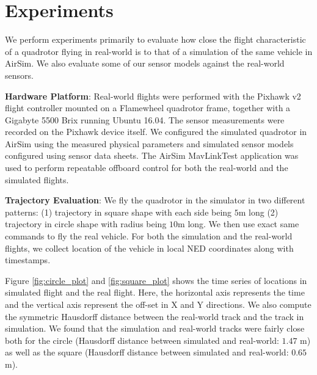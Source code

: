\documentclass[graybox]{svmult}
\begin{document}


\section{Experiments}
We perform experiments primarily to evaluate how close the flight characteristic of a quadrotor flying in real-world is to that of a simulation of the same vehicle in AirSim. We also evaluate some of our sensor models against the real-world sensors.

\vspace{0.075in}
\noindent \textbf{Hardware Platform}: Real-world flights were performed with the Pixhawk v2 flight controller mounted on a Flamewheel quadrotor frame, together with a Gigabyte 5500 Brix running Ubuntu 16.04. The sensor measurements were recorded on the Pixhawk device itself. We configured the simulated quadrotor in AirSim using the measured physical parameters and simulated sensor models configured using sensor data sheets. The AirSim MavLinkTest application was used to perform repeatable offboard control for both the real-world and the simulated flights.

\vspace{0.075in}
\noindent \textbf{Trajectory Evaluation}: We fly the quadrotor in the simulator in two different patterns: (1) trajectory in square shape with each side being $5$m long (2) trajectory in circle shape with radius being $10$m long. We then use exact same commands to fly the real vehicle. For both the simulation and the real-world flights, we collect location of the vehicle in local NED coordinates along with timestamps.

Figure \ref{fig:circle_plot} and \ref{fig:square_plot} shows the time series of locations in simulated flight and the real flight. Here, the horizontal axis represents the time and the vertical axis represent the off-set in X and Y directions. We also compute the symmetric Hausdorff distance between the real-world track and the track in simulation. We found that the simulation and real-world tracks were fairly close both for the circle (Hausdorff distance between simulated and real-world: $1.47$ m) as well as the square (Hausdorff distance between simulated and real-world: $0.65$ m).
\end{document}
